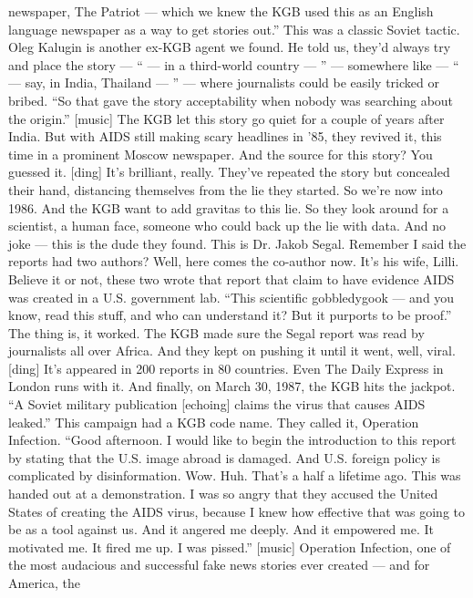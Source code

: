 \begin{itemize}
  newspaper, The Patriot --- which we knew the KGB used this as an
  English language newspaper as a way to get stories out.'' This was a
  classic Soviet tactic. Oleg Kalugin is another ex-KGB agent we found.
  He told us, they'd always try and place the story --- `` --- in a
  third-world country --- '' --- somewhere like --- `` --- say, in
  India, Thailand --- '' --- where journalists could be easily tricked
  or bribed. ``So that gave the story acceptability when nobody was
  searching about the origin.'' {[}music{]} The KGB let this story go
  quiet for a couple of years after India. But with AIDS still making
  scary headlines in '85, they revived it, this time in a prominent
  Moscow newspaper. And the source for this story? You guessed it.
  {[}ding{]} It's brilliant, really. They've repeated the story but
  concealed their hand, distancing themselves from the lie they started.
  So we're now into 1986. And the KGB want to add gravitas to this lie.
  So they look around for a scientist, a human face, someone who could
  back up the lie with data. And no joke --- this is the dude they
  found. This is Dr. Jakob Segal. Remember I said the reports had two
  authors? Well, here comes the co-author now. It's his wife, Lilli.
  Believe it or not, these two wrote that report that claim to have
  evidence AIDS was created in a U.S. government lab. ``This scientific
  gobbledygook --- and you know, read this stuff, and who can understand
  it? But it purports to be proof.'' The thing is, it worked. The KGB
  made sure the Segal report was read by journalists all over Africa.
  And they kept on pushing it until it went, well, viral. {[}ding{]}
  It's appeared in 200 reports in 80 countries. Even The Daily Express
  in London runs with it. And finally, on March 30, 1987, the KGB hits
  the jackpot. ``A Soviet military publication {[}echoing{]} claims the
  virus that causes AIDS leaked.'' This campaign had a KGB code name.
  They called it, Operation Infection. ``Good afternoon. I would like to
  begin the introduction to this report by stating that the U.S. image
  abroad is damaged. And U.S. foreign policy is complicated by
  disinformation. Wow. Huh. That's a half a lifetime ago. This was
  handed out at a demonstration. I was so angry that they accused the
  United States of creating the AIDS virus, because I knew how effective
  that was going to be as a tool against us. And it angered me deeply.
  And it empowered me. It motivated me. It fired me up. I was pissed.''
  {[}music{]} Operation Infection, one of the most audacious and
  successful fake news stories ever created --- and for America, the

\end{itemize}
